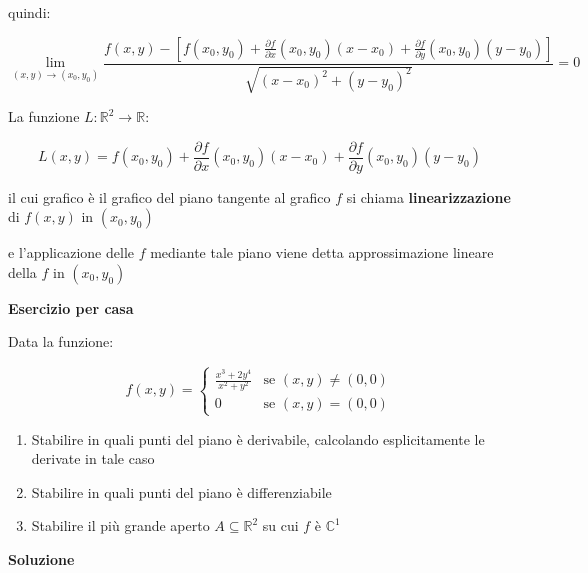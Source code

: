 \documentclass[../appunti-analisi.tex]{subfiles}
\begin{document}
quindi:

\[
    \lim_{ (x,y) \to (x_0,y_0) } \frac{f(x,y) - [f(x_0,y_0) + \frac{\partial f}{\partial x}(x_0,y_0) (x-x_0) + \frac{\partial f}{\partial y}(x_0,y_0) (y-y_0)] }{\sqrt{(x-x_0)^{2}+(y-y_0)^{2}}}= 0
\]

La funzione $L: \mathbb{R}^{2} \rightarrow \mathbb{R}$:

\[
    L(x,y) = f(x_0,y_0) + \frac{\partial f}{\partial x}(x_0,y_0) (x-x_0) + \frac{\partial f}{\partial y}(x_0,y_0) (y-y_0)
\]

il cui grafico è il grafico del piano tangente al grafico $f$ si chiama \textbf{linearizzazione} di $f(x,y)$ in $(x_0,y_0)$


e l'applicazione delle $f$ mediante tale piano viene detta approssimazione lineare della $f$ in $(x_0,y_0)$

\textbf{Esercizio per casa} 

Data la funzione:

\[
    f(x,y) = \begin{cases}
        \frac{x^{3}+2y^{4}}{x^{2}+y^{2}} & \text{se $(x,y) \neq (0,0)$} \\
        0 & \text{se $(x,y) = (0,0)$}
    \end{cases}
\]

\begin{enumerate}
    \item Stabilire in quali punti del piano è derivabile, calcolando esplicitamente le derivate in tale caso
    \item Stabilire in quali punti del piano è differenziabile
    \item Stabilire il più grande aperto $A \subseteq \mathbb{R}^{2}$ su cui $f$ è $\mathbb{C}^{1}$
\end{enumerate}

\textbf{Soluzione} 
\end{document}

